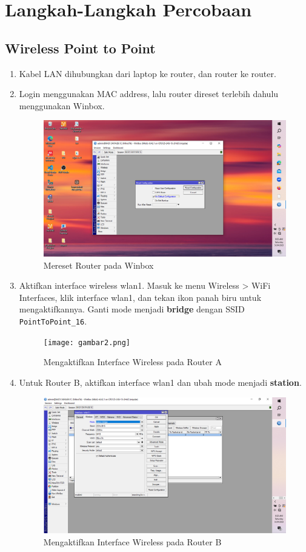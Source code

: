 \section{Langkah-Langkah Percobaan}
\subsection{Wireless Point to Point}
\begin{enumerate}
    \item Kabel LAN dihubungkan dari laptop ke router, dan router ke router.
    \item Login menggunakan MAC address, lalu router direset terlebih dahulu menggunakan Winbox.
    \begin{figure}[H]
        \centering
        \includegraphics[width=0.5\linewidth]{gambar1.png}
        \caption{Mereset Router pada Winbox}
        \label{fig:reset-router}
    \end{figure}

    \item Aktifkan interface wireless wlan1. Masuk ke menu Wireless > WiFi Interfaces, klik interface wlan1, dan tekan ikon panah biru untuk mengaktifkannya. Ganti mode menjadi \textbf{bridge} dengan SSID \texttt{PointToPoint\_16}.
    \begin{figure}[H]
        \centering
        \texttt{[image: gambar2.png]}
        \caption{Mengaktifkan Interface Wireless pada Router A}
        \label{fig:aktif-wlan-a}
    \end{figure}

    \item Untuk Router B, aktifkan interface wlan1 dan ubah mode menjadi \textbf{station}.
    \begin{figure}[H]
        \centering
        \includegraphics[width=0.5\linewidth]{gambar3a.png}
        \caption{Mengaktifkan Interface Wireless pada Router B}
        \label{fig:aktif-wlan-b}
    \end{figure}


\end{enumerate}

